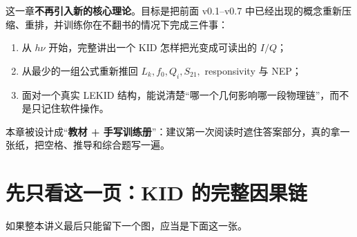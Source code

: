 \documentclass[11pt,a4paper,openany]{ctexrep}
\begin{document}
\begin{goalbox}
这一章\textbf{不再引入新的核心理论}。目标是把前面 v0.1--v0.7 中已经出现的概念重新压缩、重排，并训练你在不翻书的情况下完成三件事：
\begin{enumerate}
  \item 从 $h\nu$ 开始，完整讲出一个 KID 怎样把光变成可读出的 $I/Q$；
  \item 从最少的一组公式重新推回 $L_k,f_0,Q_i,S_{21},$ responsivity 与 NEP；
  \item 面对一个真实 LEKID 结构，能说清楚“哪一个几何影响哪一段物理链”，而不是只记住软件操作。
\end{enumerate}
本章被设计成“\textbf{教材 + 手写训练册}”：建议第一次阅读时遮住答案部分，真的拿一张纸，把空格、推导和综合题写一遍。
\end{goalbox}

\section{先只看这一页：KID 的完整因果链}

如果整本讲义最后只能留下一个图，应当是下面这一张。
\end{document}
